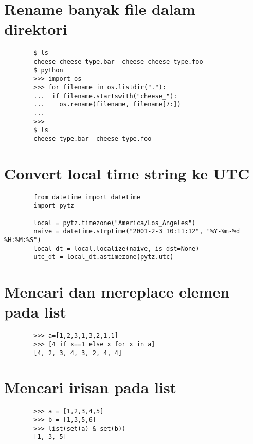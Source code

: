 \documentclass{article}
\begin{document}
	\section {Rename banyak file dalam direktori}
	\begin{lstlisting}
		$ ls
		cheese_cheese_type.bar  cheese_cheese_type.foo
		$ python
		>>> import os
		>>> for filename in os.listdir("."):
		...  if filename.startswith("cheese_"):
		...    os.rename(filename, filename[7:])
		... 
		>>> 
		$ ls
		cheese_type.bar  cheese_type.foo
	\end{lstlisting}
	
	\section {Convert local time string ke UTC}
	\begin{lstlisting}
		from datetime import datetime   
		import pytz
		
		local = pytz.timezone("America/Los_Angeles")
		naive = datetime.strptime("2001-2-3 10:11:12", "%Y-%m-%d %H:%M:%S")
		local_dt = local.localize(naive, is_dst=None)
		utc_dt = local_dt.astimezone(pytz.utc)
	\end{lstlisting}
	
	\section {Mencari dan mereplace elemen pada list}
	\begin{lstlisting}
		>>> a=[1,2,3,1,3,2,1,1]
		>>> [4 if x==1 else x for x in a]
		[4, 2, 3, 4, 3, 2, 4, 4]
	\end{lstlisting}
	
	\section {Mencari irisan pada list}
	\begin{lstlisting}
		>>> a = [1,2,3,4,5]
		>>> b = [1,3,5,6]
		>>> list(set(a) & set(b))
		[1, 3, 5]
	\end{lstlisting}
	
	
\end{document}
